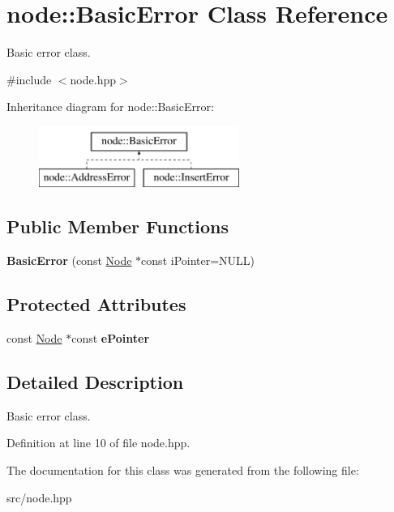 \hypertarget{classnode_1_1BasicError}{\section{node\-:\-:Basic\-Error Class Reference}
\label{classnode_1_1BasicError}
}


Basic error class.  




{\ttfamily \#include $<$node.\-hpp$>$}

Inheritance diagram for node\-:\-:Basic\-Error\-:\begin{figure}[H]
\begin{center}
\leavevmode
\includegraphics[height=2.000000cm]{classnode_1_1BasicError}
\end{center}
\end{figure}
\subsection*{Public Member Functions}
\begin{DoxyCompactItemize}
\item 
\hypertarget{classnode_1_1BasicError_a020ac995e67f64fdb4fcf3935f85fc8e}{{\bfseries Basic\-Error} (const \hyperlink{classnode_1_1Node}{Node} $\ast$const i\-Pointer=N\-U\-L\-L)}\label{classnode_1_1BasicError_a020ac995e67f64fdb4fcf3935f85fc8e}

\end{DoxyCompactItemize}
\subsection*{Protected Attributes}
\begin{DoxyCompactItemize}
\item 
\hypertarget{classnode_1_1BasicError_a8fb9d37c1e6c81e2c1f08c6ed10c4468}{const \hyperlink{classnode_1_1Node}{Node} $\ast$const {\bfseries e\-Pointer}}\label{classnode_1_1BasicError_a8fb9d37c1e6c81e2c1f08c6ed10c4468}

\end{DoxyCompactItemize}


\subsection{Detailed Description}
Basic error class. 

Definition at line 10 of file node.\-hpp.



The documentation for this class was generated from the following file\-:\begin{DoxyCompactItemize}
\item 
src/node.\-hpp\end{DoxyCompactItemize}

